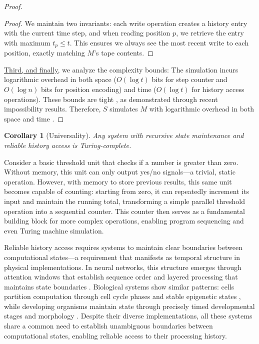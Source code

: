 \documentclass[12pt]{article}
\newtheorem{corollary}[theorem]{Corollary}
\begin{document}
\begin{proof}
\begin{proof}
We maintain two invariants: each write operation creates a history entry with the current time step, and when reading position $p$, we retrieve the entry with maximum $t_p \leq t$.
This ensures we always see the most recent write to each position, exactly matching $M$'s tape contents.
\end{proof}

\vspace{0.5em}
\noindent\underline{Third, and finally}, we analyze the complexity bounds: The simulation incurs logarithmic overhead in both space ($O(\log t)$ bits for step counter and $O(\log n)$ bits for position encoding) and time ($O(\log t)$ for history access operations). These bounds are tight \cite{parzych2024memory,hhan2024new,boyle2024memory}, as demonstrated through recent impossibility results. Therefore, $S$ simulates $M$ with logarithmic overhead in both space and time \cite{savage1994space,vonkorff2019molecular,bennett1989time}.
\end{proof}

\begin{corollary}[Universality]
Any system with recursive state maintenance and reliable history access is Turing-complete.
\end{corollary}

\vspace{1em}

Consider a basic threshold unit that checks if a number is greater than zero.
Without memory, this unit can only output yes/no signals---a trivial, static operation.
However, with memory to store previous results, this same unit becomes capable of counting: starting from zero, it can repeatedly increment its input and maintain the running total, transforming a simple parallel threshold operation into a sequential counter.
This counter then serves as a fundamental building block for more complex operations, enabling program sequencing and even Turing machine simulation.

Reliable history access requires systems to maintain clear boundaries between computational states---a requirement that manifests as temporal structure in physical implementations.
In neural networks, this structure emerges through attention windows that establish sequence order and layered processing that maintains state boundaries \cite{martini2015information,quentin2019differential}.
Biological systems show similar patterns: cells partition computation through cell cycle phases and stable epigenetic states \cite{bruno2022epigenetic}, while developing organisms maintain state through precisely timed developmental stages and morphology \cite{turing1952chemical}.
Despite their diverse implementations, all these systems share a common need to establish unambiguous boundaries between computational states, enabling reliable access to their processing history.
\end{document}
